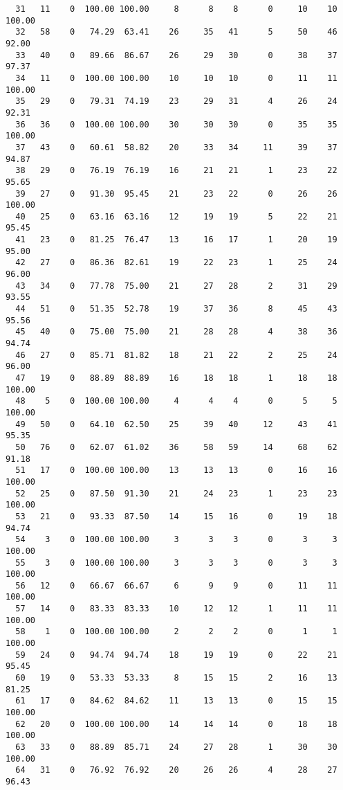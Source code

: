 \begin{verbatim}
  31   11    0  100.00 100.00     8      8    8      0     10    10   100.00
  32   58    0   74.29  63.41    26     35   41      5     50    46    92.00
  33   40    0   89.66  86.67    26     29   30      0     38    37    97.37
  34   11    0  100.00 100.00    10     10   10      0     11    11   100.00
  35   29    0   79.31  74.19    23     29   31      4     26    24    92.31
  36   36    0  100.00 100.00    30     30   30      0     35    35   100.00
  37   43    0   60.61  58.82    20     33   34     11     39    37    94.87
  38   29    0   76.19  76.19    16     21   21      1     23    22    95.65
  39   27    0   91.30  95.45    21     23   22      0     26    26   100.00
  40   25    0   63.16  63.16    12     19   19      5     22    21    95.45
  41   23    0   81.25  76.47    13     16   17      1     20    19    95.00
  42   27    0   86.36  82.61    19     22   23      1     25    24    96.00
  43   34    0   77.78  75.00    21     27   28      2     31    29    93.55
  44   51    0   51.35  52.78    19     37   36      8     45    43    95.56
  45   40    0   75.00  75.00    21     28   28      4     38    36    94.74
  46   27    0   85.71  81.82    18     21   22      2     25    24    96.00
  47   19    0   88.89  88.89    16     18   18      1     18    18   100.00
  48    5    0  100.00 100.00     4      4    4      0      5     5   100.00
  49   50    0   64.10  62.50    25     39   40     12     43    41    95.35
  50   76    0   62.07  61.02    36     58   59     14     68    62    91.18
  51   17    0  100.00 100.00    13     13   13      0     16    16   100.00
  52   25    0   87.50  91.30    21     24   23      1     23    23   100.00
  53   21    0   93.33  87.50    14     15   16      0     19    18    94.74
  54    3    0  100.00 100.00     3      3    3      0      3     3   100.00
  55    3    0  100.00 100.00     3      3    3      0      3     3   100.00
  56   12    0   66.67  66.67     6      9    9      0     11    11   100.00
  57   14    0   83.33  83.33    10     12   12      1     11    11   100.00
  58    1    0  100.00 100.00     2      2    2      0      1     1   100.00
  59   24    0   94.74  94.74    18     19   19      0     22    21    95.45
  60   19    0   53.33  53.33     8     15   15      2     16    13    81.25
  61   17    0   84.62  84.62    11     13   13      0     15    15   100.00
  62   20    0  100.00 100.00    14     14   14      0     18    18   100.00
  63   33    0   88.89  85.71    24     27   28      1     30    30   100.00
  64   31    0   76.92  76.92    20     26   26      4     28    27    96.43

\end{verbatim}
